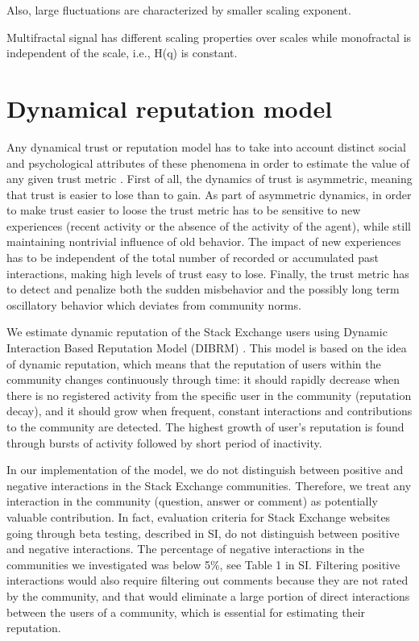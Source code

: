 Also, large fluctuations are characterized by smaller scaling exponent. 

Multifractal signal has different scaling properties over scales while monofractal is independent of the scale, i.e., H(q) is constant. 

\section{Dynamical reputation model}

Any dynamical trust or reputation model has to take into account distinct social and psychological attributes of these phenomena in order to estimate the value of any given trust metric \cite{duma2005dynamic}. First of all, the dynamics of trust is asymmetric, meaning that trust is easier to lose than to gain. As part of asymmetric dynamics, in order to make trust easier to loose the trust metric has to be sensitive to new experiences (recent activity or the absence of the activity of the agent), while still maintaining nontrivial influence of old behavior. The impact of new experiences has to be independent of
the total number of recorded or accumulated past interactions, making high levels of trust easy to lose. 
Finally, the trust metric has to detect and penalize both the sudden misbehavior and the possibly long term oscillatory behavior which deviates from community norms.

We estimate dynamic reputation of the Stack Exchange users using Dynamic Interaction Based Reputation Model (DIBRM) \cite{melnikovDynamicInteractionBasedReputation2018}. This model is based on the idea of dynamic reputation, which means that the reputation of users within the community changes continuously through time: it should rapidly decrease when there is no registered activity from the specific user in the community (reputation decay), and it should grow when frequent, constant interactions
and contributions to the community are detected. The highest growth of user's reputation is found through bursts of activity followed by short period of inactivity. 

In our implementation of the model, we do not distinguish between positive and negative interactions in the Stack Exchange communities. Therefore, we treat any interaction in the community (question, answer or comment) as potentially valuable contribution. In fact, evaluation criteria for Stack Exchange websites going through beta testing, described in SI, do not distinguish between positive and negative interactions.
The percentage of negative interactions in the communities we investigated was below 5\%, see Table 1 in SI. Filtering positive interactions would also require filtering out comments because they are not rated by the community, and that would eliminate a large portion of
direct interactions between the users of a community, which is essential for estimating their reputation.

